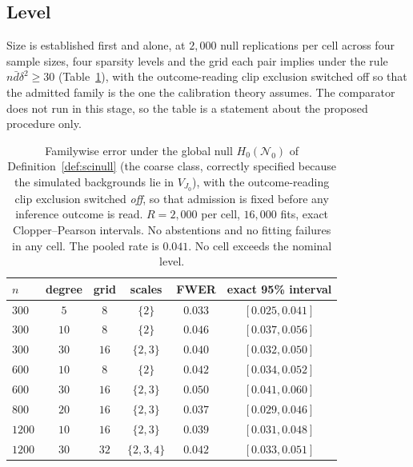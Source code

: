 \documentclass[11pt]{article}
\theoremstyle{definition}
\newcommand{\1}{\mathbf 1}\newcommand{\op}{\operatorname}
\begin{document}
\subsection{Level}                \label{sec:calib}

Size is established first and alone, at $2{,}000$ null replications per cell
across four sample sizes, four sparsity levels and the grid each pair implies
under the rule $n\bar d\delta^2\ge30$ (Table~\ref{tab:calib}), with the
outcome-reading clip exclusion switched off so that the admitted family is
the one the calibration theory assumes.  The comparator does not
run in this stage, so the table is a statement about the proposed procedure
only.

\begin{table}[t]\centering
\caption{Familywise error under the global null $H_0(\mathcal N_0)$ of
Definition~\ref{def:scinull} (the coarse class, correctly specified because
the simulated backgrounds lie in $V_{J_0}$), with the outcome-reading clip
exclusion switched \emph{off}, so that admission is fixed before any
inference outcome is read.  $R=2{,}000$ per cell, $16{,}000$ fits, exact
Clopper--Pearson intervals.  No abstentions and no fitting failures in any
cell.  The pooled rate is $0.041$.  No cell exceeds the nominal level.}
                                                              \label{tab:calib}
\begin{tabular}{lccccc}
\hline
$n$ & degree & grid & scales & FWER & exact 95\% interval\\
\hline
$300$  & $5$  & $8$  & $\{2\}$      & $0.033$ & $[0.025,0.041]$\\
$300$  & $10$ & $8$  & $\{2\}$      & $0.046$ & $[0.037,0.056]$\\
$300$  & $30$ & $16$ & $\{2,3\}$    & $0.040$ & $[0.032,0.050]$\\
$600$  & $10$ & $8$  & $\{2\}$      & $0.042$ & $[0.034,0.052]$\\
$600$  & $30$ & $16$ & $\{2,3\}$    & $0.050$ & $[0.041,0.060]$\\
$800$  & $20$ & $16$ & $\{2,3\}$    & $0.037$ & $[0.029,0.046]$\\
$1200$ & $10$ & $16$ & $\{2,3\}$    & $0.039$ & $[0.031,0.048]$\\
$1200$ & $30$ & $32$ & $\{2,3,4\}$  & $0.042$ & $[0.033,0.051]$\\
\hline
\end{tabular}
\end{table}
\end{document}
